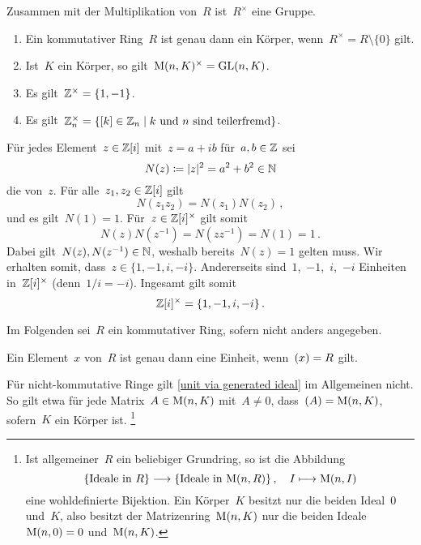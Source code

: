 \begin{proposition}
  Zusammen mit der Multiplikation von~$R$ ist~$R^\times$ eine Gruppe.
\end{proposition}

\begin{example}
  \leavevmode
  \begin{enumerate}
    \item
      Ein kommutativer Ring~$R$ ist genau dann ein Körper, wenn~$R^\times = R \setminus \{ 0 \}$ gilt.
    \item
      Ist~$K$ ein Körper, so gilt~$\operatorname{M}(n, K)^\times = \operatorname{GL}(n,K)$.
    \item
      Es gilt~$\mathbb{Z}^\times = \{1, -1\}$.
    \item
      Es gilt~$\Integer_n^\times = \{ \class{k} \in \Integer_n \suchthat \text{$k$ und~$n$ sind teilerfremd} \}$.
  \end{enumerate}
\end{example}

\begin{example}
  \label{units in gaussian integers}
  Für jedes Element~$z \in \mathbb{Z}[i]$ mit~$z = a + ib$ für~$a, b \in \mathbb{Z}$ sei
  \[
    N(z)
    \coloneqq
    \lvert z\rvert^2
    =
    a^2 + b^2
    \in \mathbb{N}
  \]
  die  von~$z$.
  Für alle~$z_1, z_2 \in \mathbb{Z}[i]$ gilt
  \[
    N(z_1 z_2)
    =
    N(z_1) N(z_2) \,,
  \]
  und es gilt~$N(1) = 1$.
  Für~$z \in \mathbb{Z}[i]^\times$ gilt somit
  \[
    N(z) N(z^{-1})
    =
    N(z z^{-1})
    =
    N(1)
    =
    1 \,.
  \]
  Dabei gilt~$N(z), N(z^{-1}) \in \mathbb{N}$, weshalb bereits~$N(z) = 1$ gelten muss.
  Wir erhalten somit, dass~$z \in \{1, -1, i, -i\}$.
  Andererseits sind~$1$,~$-1$,~$i$,~$-i$ Einheiten in~$\mathbb{Z}[i]^\times$ (denn~$1/i = -i$).
  Ingesamt gilt somit
  \[
    \mathbb{Z}[i]^\times
    =
    \{ 1, -1, i, -i \} \,.
  \]
\end{example}

\begin{convention}
  Im Folgenden sei~$R$ ein kommutativer Ring, sofern nicht anders angegeben.
\end{convention}

\begin{proposition}
  \label{unit via generated ideal}
  Ein Element~$x$ von~$R$ ist genau dann eine Einheit, wenn~$(x) = R$ gilt.
\end{proposition}

\begin{warning}
  Für nicht-kommutative Ringe gilt \cref{unit via generated ideal} im Allgemeinen nicht.
  So gilt etwa für jede Matrix~$A \in \operatorname{M}(n,K)$ mit~$A \neq 0$, dass~$(A) = \operatorname{M}(n,K)$, sofern~$K$ ein Körper ist.%
  \footnote{
    Ist allgemeiner~$R$ ein beliebiger Grundring, so ist die Abbildung
    \[
      \{ \text{Ideale in~$R$} \}
      \to
      \{ \text{Ideale in~$\Mat(n,R)$} \} \,,
      \quad
      I
      \mapsto
      \Mat(n,I)
    \]
    eine wohldefinierte Bijektion.
    Ein Körper~$K$ besitzt nur die beiden Ideal~$0$ und~$K$, also besitzt der Matrizenring~$\operatorname{M}(n,K)$ nur die beiden Ideale~$\operatorname{M}(n,0) = 0$ und~$\operatorname{M}(n,K)$.
  }
\end{warning}


